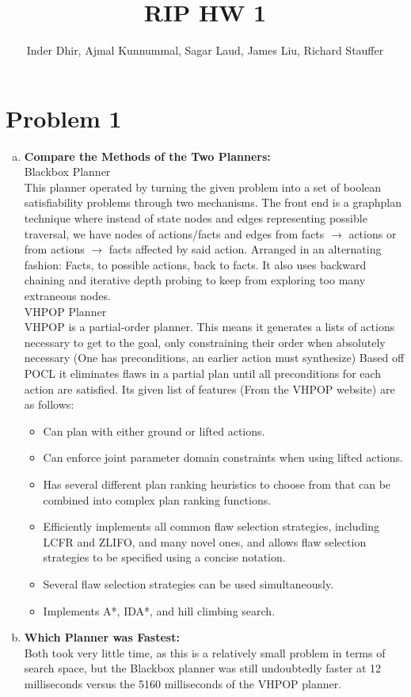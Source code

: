 \documentclass[]{article}
\title{RIP HW 1}
\author{Inder Dhir, Ajmal Kunnummal, Sagar Laud, James Liu, Richard Stauffer}
\begin{document}
\maketitle


\section{Problem 1}
	\begin{enumerate}[(a)]
	\item \textbf{Compare the Methods of the Two Planners:}\\
	Blackbox Planner\\
		This planner operated by turning the given problem into a set of boolean satisfiability problems through two mechanisms. The front end is a graphplan technique where instead of state nodes and edges representing possible traversal, we have nodes of actions/facts and edges from facts \(\rightarrow\) actions or from actions \(\rightarrow\) facts affected by said action. Arranged in an alternating fashion: Facts, to possible actions, back to facts. It also uses backward chaining and iterative depth probing to keep from exploring too many extraneous nodes. \\
	
	VHPOP Planner\\
		VHPOP is a partial-order planner. This means it generates a lists of actions necessary to get to the goal, only constraining their order when absolutely necessary (One has preconditions, an earlier action must synthesize) Based off POCL it eliminates flaws in a partial plan until all preconditions for each action are satisfied. Its given list of features (From the VHPOP website) are as follows:\\
		\begin{itemize}
		\item Can plan with either ground or lifted actions.
		 \item Can enforce joint parameter domain constraints when using lifted actions.
		 \item Has several different plan ranking heuristics to choose from that can be combined into complex plan ranking functions.
		 \item Efficiently implements all common flaw selection strategies, including LCFR and ZLIFO, and many novel ones, and allows flaw selection strategies to be specified using a concise notation.
		\item  Several flaw selection strategies can be used simultaneously.
		 \item Implements A*, IDA*, and hill climbing search.
		\end{itemize}
	\item \textbf{Which Planner was Fastest:}\\
	Both took very little time, as this is a relatively small problem in terms of search space, but  the Blackbox planner was still undoubtedly faster at 12 milliseconds versus the 5160 milliseconds of the VHPOP planner. 
	

\end{enumerate}
\end{document}
